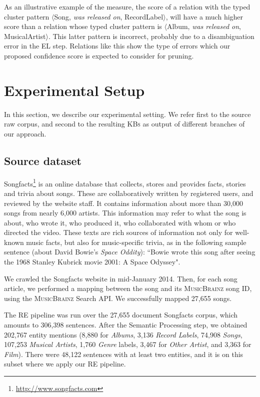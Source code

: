 As an illustrative example of the measure, the score of a relation with the typed cluster pattern $\langle$Song, \textit{was released on}, RecordLabel$\rangle$, will have a much higher score than a relation whose typed cluster pattern is $\langle$Album, \textit{was released on}, MusicalArtist$\rangle$. This latter pattern is incorrect, probably due to a disambiguation error in the \textsc{EL} step. Relations like this show the type of errors which our proposed confidence score is expected to consider for pruning.



\section{Experimental Setup}\label{sec:kb:exp}

In this section, we describe our experimental setting. We refer first to the source raw corpus, and second to the resulting \textsc{KBs} as output of different branches of our approach.


\subsection{Source dataset}\label{sec:kb:exp:dataset}

Songfacts\footnote{\url{http://www.songfacts.com}} is an online database that collects, stores and provides facts, stories and trivia about songs. These are collaboratively written by registered users, and reviewed by the website staff. It contains information about more than 30,000 songs from nearly 6,000 artists. This information may refer to what the song is about, who wrote it, who produced it, who collaborated with whom or who directed the video. These texts are rich sources of information not only for well-known music facts, but also for music-specific trivia, as in the following sample sentence (about David Bowie's \textit{Space Oddity}): ``Bowie wrote this song after seeing the 1968 Stanley Kubrick movie 2001: A Space Odyssey".

We crawled the Songfacts website in mid-January 2014. Then, for each song article, we performed a mapping between the song and its \textsc{MusicBrainz} song ID, using the \textsc{MusicBrainz} Search API. We successfully mapped 27,655 songs.

The \textsc{RE} pipeline was run over the 27,655 document Songfacts corpus, which amounts to 306,398 sentences. After the Semantic Processing step, we obtained 202,767 entity mentions (8,880 for \textit{Albums}, 3,136 \textit{Record Labels}, 74,908 \textit{Songs}, 107,253 \textit{Musical Artists}, 1,760 \textit{Genre} labels, 3,467 for \textit{Other Artist}, and 3,363 for \textit{Film}). There were 48,122 sentences with at least two entities, and it is on this subset where we apply our RE pipeline.


